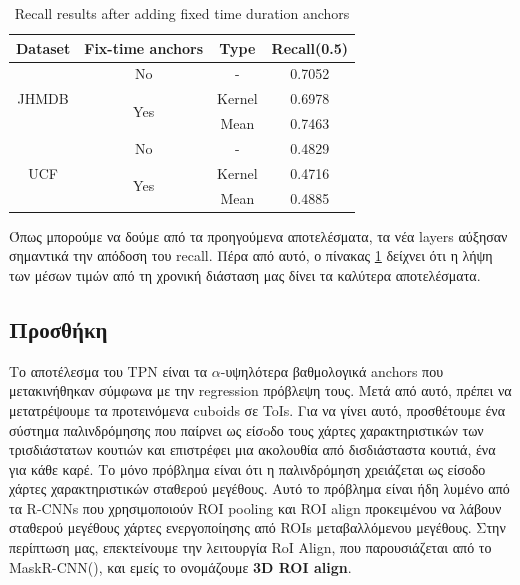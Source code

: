 \en
\begin{table}[h]
  \centering
  \begin{tabular}{||c | c | c || c ||}
    \hline
    \textbf{Dataset} & \textbf{Fix-time anchors} & \textbf{Type} & \textbf{Recall(0.5)} \\
    \hline  \hline
    \multirow{3}{4em}{JHMDB} & No &  - & 0.7052 \\
    \cline{2-4}
    {} & \multirow{2}{*}{Yes} & Kernel & 0.6978 \\
    \cline{3-4}
    {} & {} & Mean & 0.7463 \\
    \hline
    \multirow{3}{4em}{UCF} & No & - & 0.4829 \\
    \cline{2-4}
    {} & \multirow{2}{*}{Yes} & Kernel & 0.4716 \\
    \cline{3-4}
    {} & {} & Mean & 0.4885 \\
    \hline      
  \end{tabular}
  \caption{\en Recall results after adding fixed time duration anchors}
  \label{table:gr_add_16}
\end{table}
\gr

Όπως μπορούμε να δούμε από τα προηγούμενα αποτελέσματα, τα νέα \en layers \gr αύξησαν σημαντικά την απόδοση του \en recall\gr. Πέρα από αυτό, ο πίνακας \ref{table:gr_add_16} δείχνει ότι
η λήψη των μέσων τιμών από τη χρονική διάσταση μας δίνει τα καλύτερα αποτελέσματα.

\gr
\subsection{\gr Προσθήκη }
Το αποτέλεσμα του \en TPN  \gr είναι τα $\alpha$-υψηλότερα βαθμολογικά \en anchors \gr που μετακινήθηκαν σύμφωνα με την \en regression \gr πρόβλεψη τους. Μετά από αυτό, πρέπει να μετατρέψουμε τα
προτεινόμενα \en cuboids \gr σε \en ToIs\gr.
Για να γίνει αυτό, προσθέτουμε ένα σύστημα παλινδρόμησης που παίρνει ως είσoδο τους χάρτες χαρακτηριστικών των τρισδιάστατων κουτιών και επιστρέφει μια ακολουθία από δισδιάσταστα κουτιά,
ένα για κάθε καρέ.
Το μόνο πρόβλημα είναι ότι η παλινδρόμηση χρειάζεται ως είσοδο χάρτες χαρακτηριστικών  σταθερού μεγέθους. Αυτό το πρόβλημα είναι ήδη λυμένο από τα \en R-CNNs  \gr που χρησιμοποιούν \en ROI pooling \gr
και \en ROI align \gr προκειμένου να λάβουν σταθερού μεγέθους χάρτες ενεργοποίησης από \en ROIs \gr μεταβαλλόμενου μεγέθους. Στην περίπτωση μας, επεκτείνουμε την λειτουργία \en RoI Align\gr ,
που παρουσιάζεται από το \en MaskR-CNN(\cite{DBLP:journals/corr/HeGDG17})\gr, και εμείς το ονομάζουμε \en\textbf{3D ROI align}.
